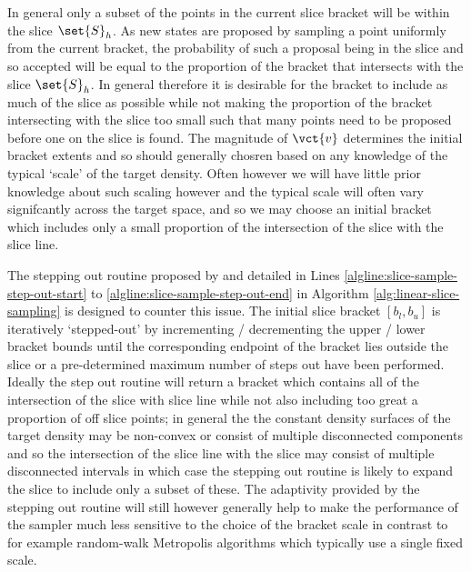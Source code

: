 In general only a subset of the points in the current slice bracket will be within the slice $\set{S}_h$. As new states are proposed by sampling a point uniformly from the current bracket, the probability of such a proposal being in the slice and so accepted will be equal to the proportion of the bracket that intersects with the slice $\set{S}_h$. In general therefore it is desirable for the bracket to include as much of the slice as possible while not making the proportion of the bracket intersecting with the slice too small such that many points need to be proposed before one on the slice is found. The magnitude of $\vct{v}$ determines the initial bracket extents and so should generally chosren based on any knowledge of the typical `scale' of the target density. Often however we will have little prior knowledge about such scaling however and the typical scale will often vary signifcantly across the target space, and so we may choose an initial bracket which includes only a small proportion of the intersection of the slice with the slice line.

The stepping out routine proposed by \citep{neal2003slice} and detailed in Lines \ref{algline:slice-sample-step-out-start} to \ref{algline:slice-sample-step-out-end} in Algorithm \ref{alg:linear-slice-sampling} is designed to counter this issue. The initial slice bracket $[b_l, b_u]$ is iteratively `stepped-out' by incrementing / decrementing the upper / lower bracket bounds until the corresponding endpoint of the bracket lies outside the slice or a pre-determined maximum number of steps out have been performed. Ideally the step out routine will return a bracket which contains all of the intersection of the slice with slice line while not also including too great a proportion of off slice points; in general the the constant density surfaces of the target density may be non-convex or consist of multiple disconnected components and so the intersection of the slice line with the slice may consist of multiple disconnected intervals in which case the stepping out routine is likely to expand the slice to include only a subset of these. The adaptivity provided by the stepping out routine will still however generally help to make the performance of the sampler much less sensitive to the choice of the bracket scale in contrast to for example random-walk Metropolis algorithms which typically use a single fixed scale. 


